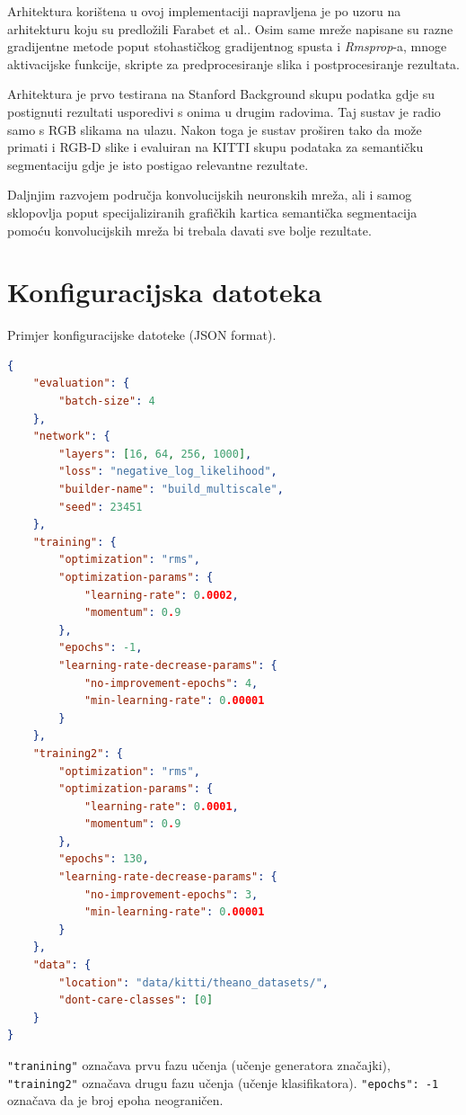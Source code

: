 \documentclass[times, utf8, diplomski, numeric]{fer}
\begin{document}
Arhitektura korištena u ovoj implementaciji napravljena je po uzoru na arhitekturu koju su predložili Farabet et al.\cite{farabet_pami}. Osim same mreže napisane su razne gradijentne metode poput stohastičkog gradijentnog spusta i \textit{Rmsprop}-a, mnoge aktivacijske funkcije, skripte za predprocesiranje slika i postprocesiranje rezultata.

Arhitektura je prvo testirana na Stanford Background skupu podatka gdje su postignuti rezultati usporedivi s onima u drugim radovima. Taj sustav je radio samo s RGB slikama na ulazu. Nakon toga je sustav proširen tako da može primati i RGB-D slike i evaluiran na KITTI skupu podataka za semantičku segmentaciju gdje je isto postigao relevantne rezultate.

Daljnjim razvojem područja konvolucijskih neuronskih mreža, ali i samog sklopovlja poput specijaliziranih grafičkih kartica semantička segmentacija pomoću konvolucijskih mreža bi trebala davati sve bolje rezultate.




\appendix
\chapter{Konfiguracijska datoteka}
\label{chap:konfiguracijska datoteka}

Primjer konfiguracijske datoteke (JSON format).
\begin{lstlisting}[language=json]
{
    "evaluation": {
        "batch-size": 4
    },
    "network": {
        "layers": [16, 64, 256, 1000],
        "loss": "negative_log_likelihood",
        "builder-name": "build_multiscale",
        "seed": 23451
    },
    "training": {
        "optimization": "rms",
        "optimization-params": {
            "learning-rate": 0.0002,
            "momentum": 0.9
        },
        "epochs": -1,
        "learning-rate-decrease-params": {
            "no-improvement-epochs": 4,
            "min-learning-rate": 0.00001
        }
    },
    "training2": {
        "optimization": "rms",
        "optimization-params": {
            "learning-rate": 0.0001,
            "momentum": 0.9
        },
        "epochs": 130,
        "learning-rate-decrease-params": {
            "no-improvement-epochs": 3,
            "min-learning-rate": 0.00001
        }
    },
    "data": {
        "location": "data/kitti/theano_datasets/",
        "dont-care-classes": [0]
    }
}
\end{lstlisting}
\texttt{"tranining"} označava prvu fazu učenja (učenje generatora značajki), \texttt{"training2"} označava drugu fazu učenja (učenje klasifikatora). \texttt{"epochs": -1} označava da je broj epoha neograničen.
\end{document}
